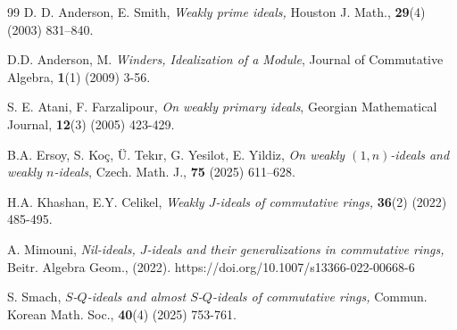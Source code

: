 \documentclass[preprint,review,10pt]{amsart}
\theoremstyle{definition}
\theoremstyle{remark}
\numberwithin{equation}{section}
\begin{document}
\begin{thebibliography}{99}
D. D. Anderson,  E. Smith, {\it Weakly prime ideals,}  Houston J. Math., {\bf 29}(4) (2003)  831–840.

D.D. Anderson, M. {\it Winders, Idealization of a Module}, Journal of Commutative Algebra, {\bf 1}(1) (2009) 3-56.


S. E. Atani, F. Farzalipour, {\it On weakly primary ideals}, Georgian Mathematical Journal, {\bf 12}(3) (2005) 423-429.


B.A. Ersoy, S. Koç, Ü. Tekır, G. Yesilot, E. Yildiz, {\it On weakly $(1,n)$-ideals and weakly $n$-ideals}, Czech. Math. J., {\bf 75} (2025) 611–628.

H.A. Khashan, E.Y. Celikel, {\it Weakly $J$-ideals of commutative rings,} {\bf 36}(2) (2022) 485-495.

A. Mimouni, {\it Nil-ideals, $J$-ideals and their generalizations in
commutative rings,}  Beitr. Algebra Geom., (2022). https://doi.org/10.1007/s13366-022-00668-6

S. Smach, {\it $S$-$Q$-ideals and almost $S$-$Q$-ideals of commutative rings,}  Commun. Korean Math. Soc., {\bf 40}(4)  (2025) 753-761.
\end{thebibliography}
\end{document}
